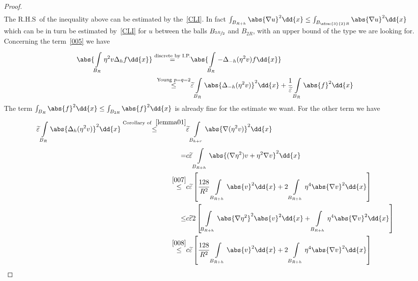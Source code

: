 \begin{proof}
\begin{gather}
	\end{gather}
	The R.H.S\ of the inequality above can be estimated by the~\eqref{CLI}. In fact \( \int_{B_{R+h}}^{} \abs{\nabla u}^{2} \dd{x} \leq \int_{B_{\sfrac{3}{2}R}}^{} \abs{\nabla u}^{2} \dd{x} \) which can be in turn be estimated by~\eqref{CLI} for \( u \) between the balls \( B_{\sfrac{3R}{2}} \) and \( B_{2R} \), with an upper bound of the type we are looking for. Concerning the term~\eqref{005} we have
	\begin{align}
		\label{005} \abs{\int\limits_{B_{R}}^{} \eta ^{2} v \Delta _{h} f \dd{x}} \overset{\text{discrete by I.P.}}{=} & \abs{\int\limits_{B_{R}}^{} - \Delta _{-h} (\eta ^{2} v) f  \dd{x}}  \\
		\overset{\text{Young }p=q=2}{\leq}                                                                             & \widetilde{\varepsilon} \int\limits_{B_{R}}^{} \abs{\Delta _{-h}(\eta ^{2}v)}^{2} \dd{x} + \frac{1}{ \widetilde{\varepsilon}} \int\limits_{B_{R}}^{} \abs{f}^{2} \dd{x} \notag
	\end{align}
	The term \( \int_{B_{R}}^{} \abs{f}^{2} \dd{x} \leq \int_{B_{2R}}^{} \abs{f}^{2} \dd{x} \) is already fine for the estimate we want. For the other term we have
	\begin{align}
		\widetilde{\varepsilon }\int\limits_{B_{R}}^{} \abs{\Delta _{h}(\eta ^{2}v)}^{2} \dd{x} \overset{\text{Corollary of }~\ref{lemma01}}{\leq} & \widetilde{\varepsilon } \int\limits_{B_{h+r}}^{} \abs{\nabla (\eta ^{2}v) }^{2} \dd{x}  \\
		=                                                                                                                                          & c \widetilde{\varepsilon }\int\limits_{B_{R+h}}^{} \abs{(\nabla \eta ^{2})v+\eta ^{2} \nabla v }^{2} \dd{x}  \\
		\overset{\eqref{007}}{\leq}                                                                                                                & c \widetilde{\varepsilon} \left[ \frac{128}{R^{2}} \int\limits_{B_{R+h}}^{} \abs{v}^{2} \dd{x} + 2 \int\limits_{B_{R+h}}^{} \eta ^{4} \abs{\nabla v}^{2} \dd{x} \right]  \\
		\leq                                                                                                                                       & c \widetilde{\varepsilon } 2 \left[ \int\limits_{B_{R+h}}^{} \abs{\nabla \eta ^{2}}^{2} \abs{v}^{2} \dd{x} + \int\limits_{B_{R+h}}^{} \eta ^{4} \abs{\nabla v}^{2} \dd{x} \right]  \\
		\overset{\eqref{008}}{\leq}                                                                                                                & c \widetilde{\varepsilon} \left[ \frac{128}{R^{2}} \int\limits_{B_{R+h}}^{} \abs{v}^{2} \dd{x} + 2 \int\limits_{B_{R+h}}^{} \eta ^{4} \abs{\nabla v}^{2} \dd{x} \right]  \\

\end{align}
\end{proof}
